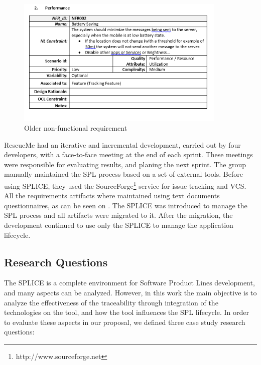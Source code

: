 \begin{figure}[htp]
\begin{center}
  \includegraphics[width=10cm]{chapters/experiment/img/old-req.PNG}
  \caption[Product Development]{Older non-functional requirement}
  \label{fg:spl-reqdoc}
\end{center}
\end{figure}

RescueMe had an iterative and incremental development, carried out by four developers, with a face-to-face meeting at the end of each sprint. These meetings were responsible for evaluating results, and planing the next sprint. The group manually maintained the \ac{SPL} process based on a set of external tools. Before using \ac{SPLICE}, they used the SourceForge\footnote{http://www.sourceforge.net} service for issue tracking and \acf{VCS}. All the requirements artifacts where maintained using text documents questionnaires, as can be seen on .
The \ac{SPLICE} was introduced to manage the \ac{SPL} process and all artifacts were migrated to it. After the migration, the development continued to use only the \ac{SPLICE} to manage the application lifecycle.

\subsection{Research Questions}

The \ac{SPLICE} is a complete environment for Software Product Lines development, and many aspects can be analyzed. However, in this work the main objective is to analyze the effectiveness of the traceability through integration of the technologies on the tool, and how the tool influences the \acf{SPL} lifecycle. 
In order to evaluate these aspects in our proposal, we defined three case study research questions:

